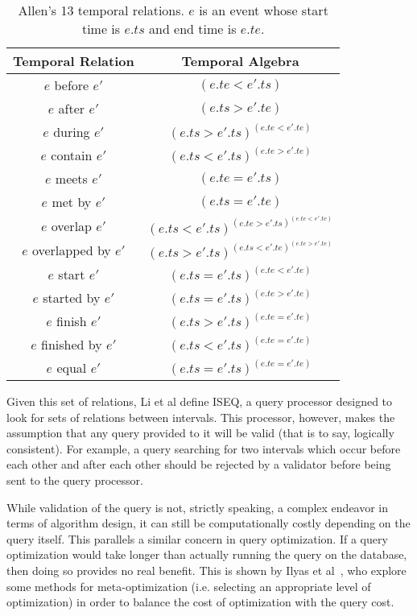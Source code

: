 \documentclass[10pt,letterpaper]{article}
\begin{document}
\begin{table}[!ht]\centering
\begin{tabular}{|c|c|}\hline
\textbf{Temporal Relation} & \textbf{Temporal Algebra}\\\hline
$e$ before $e'$ & $(e.te < e'.ts)$\\\hline
$e$ after $e'$ & $(e.ts > e'.te)$\\\hline
$e$ during $e'$ & $(e.ts > e'.ts) ^ (e.te < e'.te)$ \\\hline
$e$ contain $e'$ & $(e.ts < e'.ts) ^ (e.te > e'.te)$ \\\hline
$e$ meets $e'$ & $(e.te = e'.ts)$ \\\hline
$e$ met by $e'$ & $(e.ts = e'.te)$ \\\hline
$e$ overlap $e'$ & $(e.ts < e'.ts) ^ (e.te > e'.ts) ^ (e.te < e'.te)$ \\\hline
$e$ overlapped by $e'$ & $(e.ts > e'.ts) ^ (e.ts < e'.te) ^ (e.te > e'.te)$ \\\hline
$e$ start $e'$ & $(e.ts = e'.ts) ^ (e.te < e'.te)$ \\\hline
$e$ started by $e'$ & $(e.ts = e'.ts) ^ (e.te > e'.te)$ \\\hline
$e$ finish $e'$ & $(e.ts > e'.ts) ^ (e.te = e'.te)$ \\\hline
$e$ finished by $e'$ & $(e.ts < e'.ts) ^ (e.te = e'.te)$ \\\hline
$e$ equal $e'$ & $(e.ts = e'.ts) ^ (e.te = e'.te)$ \\\hline
\end{tabular}
\caption{Allen's 13 temporal relations. $e$ is an event whose start time is $e.ts$ and end time is $e.te$.}\label{tab:relations}
\end{table}

Given this set of relations, Li et al define ISEQ, a query processor designed to look for sets of relations between intervals. This processor, however, makes the assumption that any query provided to it will be valid (that is to say, logically consistent).  For example, a query searching for two intervals which occur before each other and after each other should be rejected by a validator before being sent to the query processor.

While validation of the query is not, strictly speaking, a complex endeavor in terms of algorithm design, it can still be computationally costly depending on the query itself.  This parallels a similar concern in query optimization.  If a query optimization would take longer than actually running the query on the database, then doing so  provides no real benefit.  This is shown by Ilyas et al~\cite{Ilyas:2003}, who explore some methods for meta-optimization (i.e. selecting an appropriate level of optimization) in order to balance the cost of optimization with the query cost.
\end{document}
